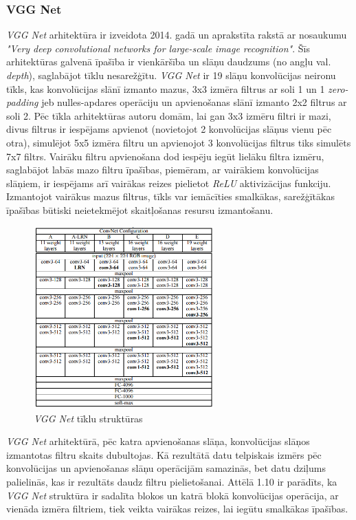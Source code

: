 \subsubsection{VGG Net}
\textit{VGG Net} arhitektūra ir izveidota 2014. gadā un aprakstīta rakstā ar nosaukumu \textit{"Very deep convolutional networks for large-scale image recognition"}\cite{simonyan2014very}. Šīs arhitektūras galvenā īpašība ir vienkāršība un slāņu daudzums (no angļu val. \textit{depth}), saglabājot tīklu nesarežģītu. \textit{VGG Net} ir 19 slāņu konvolūcijas neironu tīkls, kas konvolūcijas slānī izmanto mazus, 3x3 izmēra filtrus ar soli 1 un 1 \textit{zero-padding} jeb nulles-apdares operāciju un apvienošanas slānī izmanto 2x2 filtrus ar soli 2.
Pēc tīkla arhitektūras autoru domām, lai gan 3x3 izmēru filtri ir mazi, divus filtrus ir iespējams apvienot (novietojot 2 konvolūcijas slāņus vienu pēc otra), simulējot 5x5 izmēra filtru un apvienojot 3 konvolūcijas filtrus tiks simulēts 7x7 filtrs. Vairāku filtru apvienošana dod iespēju iegūt lielāku filtra izmēru, saglabājot labās mazo filtru īpašības, piemēram, ar vairākiem konvolūcijas slāņiem, ir iespējams arī vairākas reizes pielietot \textit{ReLU} aktivizācijas funkciju. Izmantojot vairākus mazus filtrus, tīkls var iemācīties smalkākas, sarežģītākas īpašības būtiski neietekmējot skaitļošanas resursu izmantošanu.
\begin{figure}[h]%
	\centering
	\includegraphics[height=7cm]{images/vggnet.png} %
	\caption{\textit{VGG Net} tīklu struktūras \cite{simonyan2014very}}%
	\label{fig:example}%
\end{figure}

\textit{VGG Net} arhitektūrā, pēc katra apvienošanas slāņa, konvolūcijas slāņos izmantotas filtru skaits dubultojas. Kā rezultātā datu telpiskais izmērs pēc konvolūcijas un apvienošanas slāņu operācijām samazinās, bet datu dziļums palielinās, kas ir rezultāts daudz filtru pielietošanai. Attēlā 1.10 ir parādīts, ka \textit{VGG Net} struktūra ir sadalīta blokos un katrā blokā konvolūcijas operācija, ar vienāda izmēra filtriem, tiek veikta vairākas reizes, lai iegūtu smalkākas īpašības.
